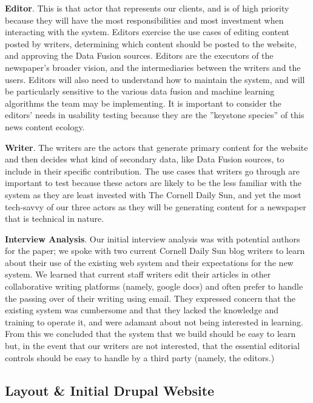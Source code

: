 \documentclass[12pt]{article} %
\begin{document}
\textbf{Editor}. This is that actor that represents our clients, and is of high priority because they will have the most responsibilities and most investment when interacting with the system. Editors exercise the use cases of editing content posted by writers, determining which content should be posted to the website, and approving the Data Fusion sources. Editors are the executors of the newspaper’s broader vision, and the intermediaries between the writers and the users. Editors will also need to understand how to maintain the system, and will be particularly sensitive to the various data fusion and machine learning algorithms the team may be implementing. It is important to consider the editors’ needs in usability testing because they are the ”keystone species” of this news content ecology.
                   
\textbf{Writer}. The writers are the actors that generate primary content for the website and then decides what kind of secondary data, like Data Fusion sources, to include in their specific contribution. The use cases that writers go through are important to test because these actors are likely to be the less familiar with the system as they are least invested with The Cornell Daily Sun, and yet the most tech-savvy of our three actors as they will be generating content for a newspaper that is technical in nature.

\textbf{Interview Analysis}. Our initial interview analysis was with potential authors for the paper; we spoke with two current Cornell Daily Sun blog writers to learn about their use of the existing web system and their expectations for the new system. We learned that current staff writers edit their articles in other collaborative writing platforms (namely, google docs) and often prefer to handle the passing over of their writing using email. They expressed concern that the existing system was cumbersome and that they lacked the knowledge and training to operate it, and were adamant about not being interested in learning. From this we concluded that the system that we build should be easy to learn but, in the event that our writers are not interested, that the essential editorial controls should be easy to handle by a third party (namely, the editors.)


\subsection{Layout \& Initial Drupal Website}
\end{document}
